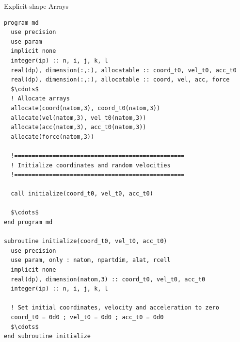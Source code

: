 \documentclass[c,mathserif,compress,xcolor=svgnames]{beamer}
\begin{document}
\begin{frame}[fragile]{Explicit-shape Arrays}
  \begin{lstlisting}[language={[90]Fortran},basicstyle=\fontsize{4.5}{5.5}\selectfont\ttfamily,mathescape]
program md
  use precision
  use param
  implicit none
  integer(ip) :: n, i, j, k, l
  real(dp), dimension(:,:), allocatable :: coord_t0, vel_t0, acc_t0
  real(dp), dimension(:,:), allocatable :: coord, vel, acc, force
  $\cdots$
  ! Allocate arrays
  allocate(coord(natom,3), coord_t0(natom,3))
  allocate(vel(natom,3), vel_t0(natom,3))
  allocate(acc(natom,3), acc_t0(natom,3))
  allocate(force(natom,3))

  !=================================================
  ! Initialize coordinates and random velocities
  !=================================================

  call initialize(coord_t0, vel_t0, acc_t0)

  $\cdots$
end program md

subroutine initialize(coord_t0, vel_t0, acc_t0)
  use precision
  use param, only : natom, npartdim, alat, rcell
  implicit none
  real(dp), dimension(natom,3) :: coord_t0, vel_t0, acc_t0
  integer(ip) :: n, i, j, k, l

  ! Set initial coordinates, velocity and acceleration to zero
  coord_t0 = 0d0 ; vel_t0 = 0d0 ; acc_t0 = 0d0
  $\cdots$
end subroutine initialize
  \end{lstlisting}
\end{frame}
\end{document}
